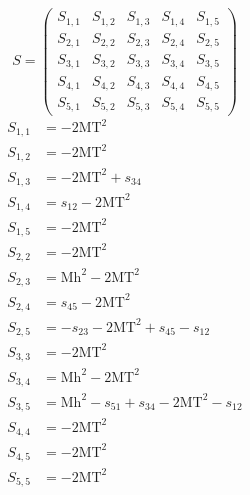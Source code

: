 \documentclass[a4paper]{article}
\begin{document}
\begin{equation}
S=\left(\begin{array}{ccccc}
   S_{1,1}&
   S_{1,2}&
   S_{1,3}&
   S_{1,4}&
   S_{1,5}\\
   S_{2,1}&
   S_{2,2}&
   S_{2,3}&
   S_{2,4}&
   S_{2,5}\\
   S_{3,1}&
   S_{3,2}&
   S_{3,3}&
   S_{3,4}&
   S_{3,5}\\
   S_{4,1}&
   S_{4,2}&
   S_{4,3}&
   S_{4,4}&
   S_{4,5}\\
   S_{5,1}&
   S_{5,2}&
   S_{5,3}&
   S_{5,4}&
   S_{5,5}\end{array}\right)
\end{equation}
\begin{subequations}
\begin{align}
   S_{1,1}&=-2\text{MT}^2\\
   S_{1,2}&=-2\text{MT}^2\\
   S_{1,3}&=-2\text{MT}^2+s_{34}\\
   S_{1,4}&=s_{12}-2\text{MT}^2\\
   S_{1,5}&=-2\text{MT}^2\\
   S_{2,2}&=-2\text{MT}^2\\
   S_{2,3}&=\text{Mh}^2-2\text{MT}^2\\
   S_{2,4}&=s_{45}-2\text{MT}^2\\
   S_{2,5}&=-s_{23}-2\text{MT}^2+s_{45}-s_{12}\\
   S_{3,3}&=-2\text{MT}^2\\
   S_{3,4}&=\text{Mh}^2-2\text{MT}^2\\
   S_{3,5}&=\text{Mh}^2-s_{51}+s_{34}-2\text{MT}^2-s_{12}\\
   S_{4,4}&=-2\text{MT}^2\\
   S_{4,5}&=-2\text{MT}^2\\
   S_{5,5}&=-2\text{MT}^2
\end{align}
\end{subequations}
\end{document}
